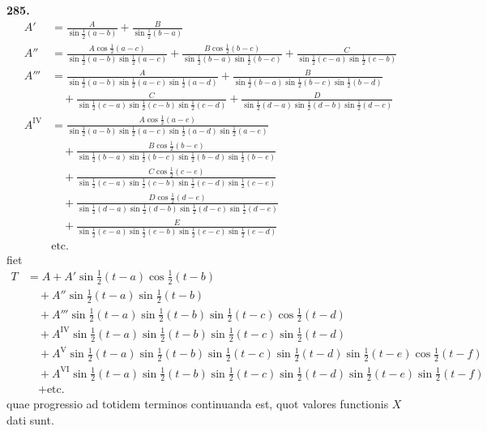 \documentclass[12pt,a4paper]{article}
\begin{document}
\newpage
\noindent\textbf{285.}
\begin{align*}
A' &= \frac{A}{\sin\tfrac{1}{2}(a-b)} + \frac{B}{\sin\tfrac{1}{2}(b-a)}\\
A'' &= \frac{A\cos\tfrac{1}{2}(a-c)}{\sin\tfrac{1}{2}(a-b)\sin\tfrac{1}{2}(a-c)}
+ \frac{B\cos\tfrac{1}{2}(b-c)}{\sin\tfrac{1}{2}(b-a)\sin\tfrac{1}{2}(b-c)}
+ \frac{C}{\sin\tfrac{1}{2}(c-a)\sin\tfrac{1}{2}(c-b)}\\
A''' &=
\frac{A}{\sin\tfrac{1}{2}(a-b)\sin\tfrac{1}{2}(a-c)\sin\tfrac{1}{2}(a-d)}
+ \frac{B}{\sin\tfrac{1}{2}(b-a)\sin\tfrac{1}{2}(b-c)\sin\tfrac{1}{2}(b-d)}\\
&\quad + \frac{C}{\sin\tfrac{1}{2}(c-a)\sin\tfrac{1}{2}(c-b)\sin\tfrac{1}{2}(c-d)}
+ \frac{D}{\sin\tfrac{1}{2}(d-a)\sin\tfrac{1}{2}(d-b)\sin\tfrac{1}{2}(d-c)}\\
A^{\mathrm{IV}} &=
\frac{A\cos\tfrac{1}{2}(a-e)}{\sin\tfrac{1}{2}(a-b)\sin\tfrac{1}{2}(a-c)\sin\tfrac{1}{2}(a-d)\sin\tfrac{1}{2}(a-e)}\\
&\quad + \frac{B\cos\tfrac{1}{2}(b-e)}{\sin\tfrac{1}{2}(b-a)\sin\tfrac{1}{2}(b-c)\sin\tfrac{1}{2}(b-d)\sin\tfrac{1}{2}(b-e)}\\
&\quad + \frac{C\cos\tfrac{1}{2}(c-e)}{\sin\tfrac{1}{2}(c-a)\sin\tfrac{1}{2}(c-b)\sin\tfrac{1}{2}(c-d)\sin\tfrac{1}{2}(c-e)}\\
&\quad + \frac{D\cos\tfrac{1}{2}(d-e)}{\sin\tfrac{1}{2}(d-a)\sin\tfrac{1}{2}(d-b)\sin\tfrac{1}{2}(d-c)\sin\tfrac{1}{2}(d-e)}\\
&\quad + \frac{E}{\sin\tfrac{1}{2}(e-a)\sin\tfrac{1}{2}(e-b)\sin\tfrac{1}{2}(e-c)\sin\tfrac{1}{2}(e-d)}\\
&\text{etc.}
\end{align*}
fiet
\begin{align*}
T &= A + A'\sin\tfrac{1}{2}(t-a)\cos\tfrac{1}{2}(t-b)\\
&\quad + A''\sin\tfrac{1}{2}(t-a)\sin\tfrac{1}{2}(t-b)\\
&\quad + A'''\sin\tfrac{1}{2}(t-a)\sin\tfrac{1}{2}(t-b)\sin\tfrac{1}{2}(t-c)\cos\tfrac{1}{2}(t-d)\\
&\quad + A^{\mathrm{IV}}\sin\tfrac{1}{2}(t-a)\sin\tfrac{1}{2}(t-b)\sin\tfrac{1}{2}(t-c)\sin\tfrac{1}{2}(t-d)\\
&\quad + A^{\mathrm{V}}\sin\tfrac{1}{2}(t-a)\sin\tfrac{1}{2}(t-b)\sin\tfrac{1}{2}(t-c)
\sin\tfrac{1}{2}(t-d)\sin\tfrac{1}{2}(t-e)\cos\tfrac{1}{2}(t-f)\\
&\quad + A^{\mathrm{VI}}\sin\tfrac{1}{2}(t-a)\sin\tfrac{1}{2}(t-b)\sin\tfrac{1}{2}(t-c)
\sin\tfrac{1}{2}(t-d)\sin\tfrac{1}{2}(t-e)\sin\tfrac{1}{2}(t-f)\\
&\quad + \text{etc.}
\end{align*}
quae progressio ad totidem terminos continuanda est, quot valores functionis $X$
dati sunt.
\end{document}
